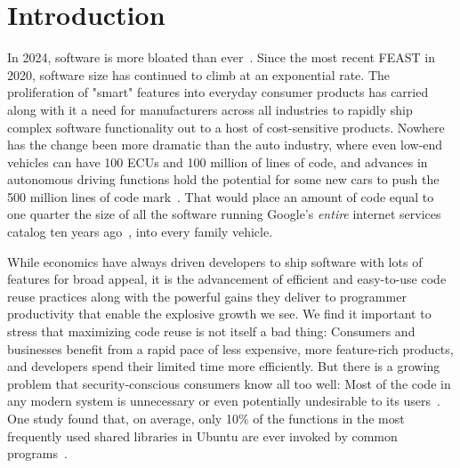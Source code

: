 \documentclass[sigconf]{acmart}
\begin{document}


\maketitle

\section{Introduction}
In 2024, software is more bloated than ever~\cite{hubert2024}.  Since the
most recent FEAST in 2020, software size has continued to climb at an
exponential rate. The proliferation of "smart" features into everyday consumer
products has carried along with it a need for manufacturers across all
industries to rapidly ship complex software functionality out to a host of
cost-sensitive products. Nowhere has the change been more dramatic than the auto
industry, where even low-end vehicles can have 100 ECUs and 100 million of lines
of code, and advances in autonomous driving functions hold the potential for
some new cars to push the 500 million lines of code mark~\cite{charette2021}.
That would place an amount of code equal to one quarter the size of all the
software running Google's \emph{entire} internet services catalog ten years
ago~\cite{potvin2015}, into every family vehicle.

While economics have always driven developers to ship software with lots of
features for broad appeal, it is the advancement of efficient and easy-to-use
code reuse practices along with the powerful gains they deliver to programmer
productivity that enable the explosive growth we see.  We find it important to
stress that maximizing code reuse is not itself a bad thing: Consumers and
businesses benefit from a rapid pace of less expensive, more feature-rich
products, and developers spend their limited time more efficiently.  But there
is a growing problem that security-conscious consumers know all too well: Most
of the code in any modern system is unnecessary or even potentially undesirable
to its users~\cite{quach2017}.  One study found that, on average, only 10\% of
the functions in the most frequently used shared libraries in Ubuntu are ever
invoked by common programs~\cite{quach2018}.
\end{document}
